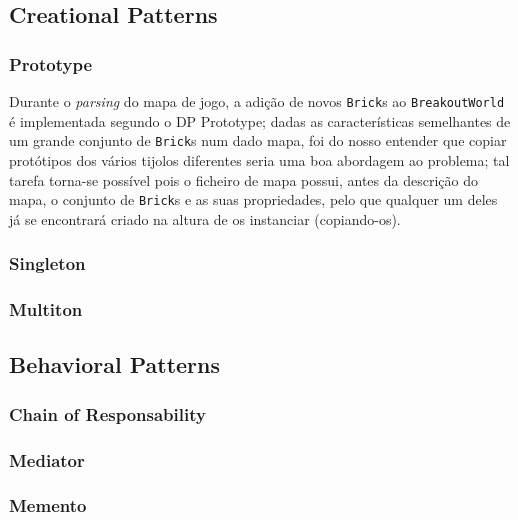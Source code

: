 \documentclass[a4paper]{article}
\begin{document}
\subsection{Creational Patterns}
\subsubsection{Prototype}
\noindent Durante o \textit{parsing} do mapa de jogo, a adição de novos \texttt{Brick}s ao \texttt{BreakoutWorld} é implementada segundo o DP Prototype; dadas as características semelhantes de um grande conjunto de \texttt{Brick}s num dado mapa, foi do nosso entender que copiar protótipos dos vários tijolos diferentes seria uma boa abordagem ao problema; tal tarefa torna-se possível pois o ficheiro de mapa possui, antes da descrição do mapa, o conjunto de \texttt{Brick}s e as suas propriedades, pelo que qualquer um deles já se encontrará criado na altura de os instanciar (copiando-os).

\subsubsection{Singleton}

\subsubsection{Multiton}


\subsection{Behavioral Patterns}
\subsubsection{Chain of Responsability}

\subsubsection{Mediator}

\subsubsection{Memento}
\end{document}
